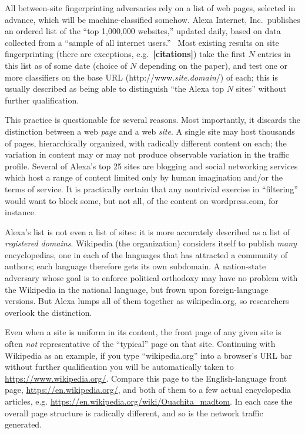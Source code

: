 \documentclass[tinymargin]{zarticle}
\def\todo#1{{\color{todocolor}\bfseries [#1]}}
\begin{document}
All between-site fingerprinting adversaries rely on a list of web
pages, selected in advance, which will be machine-classified somehow.
Alexa Internet, Inc.\ publishes an ordered list of the “top 1,000,000
websites,” updated daily, based on data collected from a “sample of
all internet users.”~\cite{alexa.undated.topsites} Most existing
results on site fingerprinting (there are exceptions,
e.g.~\todo{citations}) take the first $N$ entries in this list as of
some date (choice of $N$ depending on the paper), and test one or more
classifiers on the base URL
(\textsf{http://www.\textit{site.domain}/}) of each; this is usually
described as being able to distinguish “the Alexa top $N$ sites”
without further qualification.

This practice is questionable for several reasons.  Most importantly,
it discards the distinction between a web \emph{page} and a web
\emph{site}.  A single site may host thousands of pages,
hierarchically organized, with radically different content on each;
the variation in content may or may not produce observable variation
in the traffic profile.  Several of Alexa's top 25 sites are blogging
and social networking services which host a range of content limited
only by human imagination and/or the terms of service.  It is
practically certain that any nontrivial exercise in “filtering” would
want to block some, but not all, of the content on
\textsf{wordpress.com}, for instance.

Alexa's list is not even a list of sites: it is more accurately
described as a list of \emph{registered domains}.  Wikipedia (the
organization) considers itself to publish \emph{many} encyclopedias,
one in each of the languages that has attracted a community of
authors; each language therefore gets its own subdomain.  A
nation-state adversary whose goal is to enforce political orthodoxy
may have no problem with the Wikipedia in the national language, but
frown upon foreign-language versions.  But Alexa lumps all of them
together as \textsf{wikipedia.org}, so researchers overlook the
distinction.

Even when a site is uniform in its content, the front page of any
given site is often \emph{not} representative of the “typical” page on
that site. Continuing with Wikipedia as an example, if you type
“\textsf{wikipedia.org}” into a browser's URL bar without further
qualification you will be automatically taken to
\url{https://www.wikipedia.org/}.  Compare this page to the
English-language front page, \url{https://en.wikipedia.org/}, and both
of them to a few actual encyclopedia articles,
e.g. \url{https://en.wikipedia.org/wiki/Ouachita_madtom}.  In each
case the overall page structure is radically different, and so is the
network traffic generated.
\end{document}

